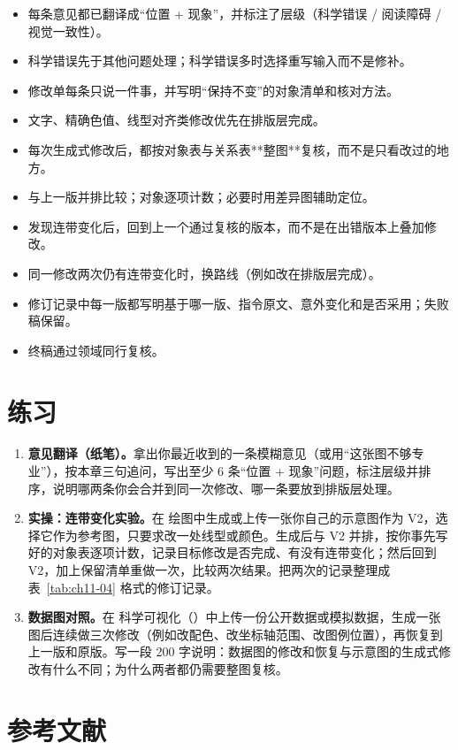 \begin{itemize}
\item 每条意见都已翻译成“位置 + 现象”，并标注了层级（科学错误 / 阅读障碍 / 视觉一致性）。
\item 科学错误先于其他问题处理；科学错误多时选择重写输入而不是修补。
\item 修改单每条只说一件事，并写明“保持不变”的对象清单和核对方法。
\item 文字、精确色值、线型对齐类修改优先在排版层完成。
\item 每次生成式修改后，都按对象表与关系表**整图**复核，而不是只看改过的地方。
\item 与上一版并排比较；对象逐项计数；必要时用差异图辅助定位。
\item 发现连带变化后，回到上一个通过复核的版本，而不是在出错版本上叠加修改。
\item 同一修改两次仍有连带变化时，换路线（例如改在排版层完成）。
\item 修订记录中每一版都写明基于哪一版、指令原文、意外变化和是否采用；失败稿保留。
\item 终稿通过领域同行复核。
\end{itemize}

\section{练习}

\begin{enumerate}
\item \textbf{意见翻译（纸笔）。}拿出你最近收到的一条模糊意见（或用“这张图不够专业”），按本章三句追问，写出至少 6 条“位置 + 现象”问题，标注层级并排序，说明哪两条你会合并到同一次修改、哪一条要放到排版层处理。
\item \textbf{\scidraw{} 实操：连带变化实验。}在 \scidraw{} 绘图中生成或上传一张你自己的示意图作为 V2，选择它作为参考图，只要求改一处线型或颜色。生成后与 V2 并排，按你事先写好的对象表逐项计数，记录目标修改是否完成、有没有连带变化；然后回到 V2，加上保留清单重做一次，比较两次结果。把两次的记录整理成表~\ref{tab:ch11-04} 格式的修订记录。
\item \textbf{数据图对照。}在 \scidraw{} 科学可视化（）中上传一份公开数据或模拟数据，生成一张图后连续做三次修改（例如改配色、改坐标轴范围、改图例位置），再恢复到上一版和原版。写一段 200 字说明：数据图的修改和恢复与示意图的生成式修改有什么不同；为什么两者都仍需要整图复核。
\end{enumerate}

\section*{参考文献}

